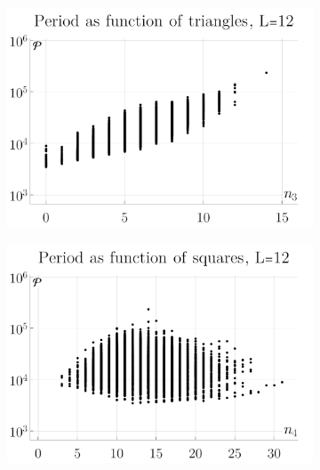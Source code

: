 \documentclass[11pt]{scrartcl}
\numberwithin{equation}{section}
\begin{document}
\begin{figure}[htb]
	\centering 
	\begin{subfigure}[b]{.32 \textwidth}
		\includegraphics[width=\linewidth]{figures/period_triangles}
		\subcaption{}
		\label{fig:period_triangles}
	\end{subfigure}
	\begin{subfigure}[b]{.32 \textwidth}
		\includegraphics[width=\linewidth]{figures/period_squares}
		\subcaption{}
		\label{fig:period_triangles_squares}
	\end{subfigure}
	\begin{subfigure}[b]{.32 \textwidth}

\end{subfigure}
\end{figure}
\end{document}

